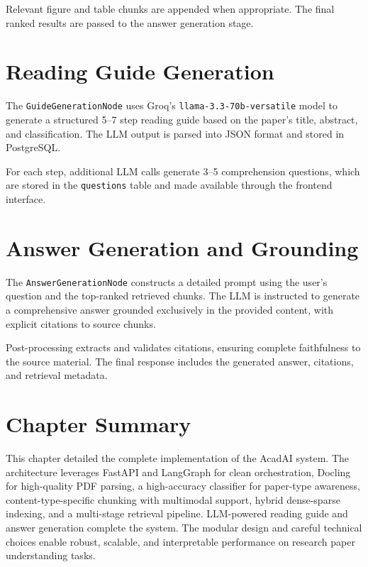 \documentclass[12pt,a4paper]{report}
\begin{document}
Relevant figure and table chunks are appended when appropriate. The final ranked results are passed to the answer generation stage.

\section{Reading Guide Generation}

The \texttt{GuideGenerationNode} uses Groq’s \texttt{llama-3.3-70b-versatile} model to generate a structured 5--7 step reading guide based on the paper’s title, abstract, and classification. The LLM output is parsed into JSON format and stored in PostgreSQL.

For each step, additional LLM calls generate 3--5 comprehension questions, which are stored in the \texttt{questions} table and made available through the frontend interface.

\section{Answer Generation and Grounding}

The \texttt{AnswerGenerationNode} constructs a detailed prompt using the user’s question and the top-ranked retrieved chunks. The LLM is instructed to generate a comprehensive answer grounded exclusively in the provided content, with explicit citations to source chunks.

Post-processing extracts and validates citations, ensuring complete faithfulness to the source material. The final response includes the generated answer, citations, and retrieval metadata.

\section{Chapter Summary}

This chapter detailed the complete implementation of the AcadAI system. The architecture leverages FastAPI and LangGraph for clean orchestration, Docling for high-quality PDF parsing, a high-accuracy classifier for paper-type awareness, content-type-specific chunking with multimodal support, hybrid dense-sparse indexing, and a multi-stage retrieval pipeline. LLM-powered reading guide and answer generation complete the system. The modular design and careful technical choices enable robust, scalable, and interpretable performance on research paper understanding tasks.

\end{document}
